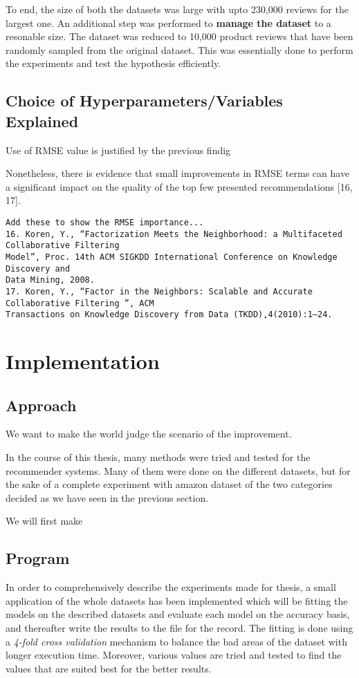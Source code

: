 To end, the size of both the datasets was large with upto 230,000 reviews for the largest one. An additional step was performed to \textbf{manage the dataset} to a resonable size. The dataset was reduced to 10,000 product reviews that have been randomly sampled from the original dataset. This was essentially done to perform the experiments and test the hypothesis efficiently.


\subsection{Choice of Hyperparameters/Variables Explained}

Use of RMSE value is justified by the previous findig


Nonetheless, there is evidence that small improvements in RMSE terms can have a significant impact on the quality of the top few presented recommendations [16, 17].

\begin{verbatim}
Add these to show the RMSE importance...
16. Koren, Y., “Factorization Meets the Neighborhood: a Multifaceted Collaborative Filtering
Model”, Proc. 14th ACM SIGKDD International Conference on Knowledge Discovery and
Data Mining, 2008.
17. Koren, Y., “Factor in the Neighbors: Scalable and Accurate Collaborative Filtering ”, ACM
Transactions on Knowledge Discovery from Data (TKDD),4(2010):1–24.
\end{verbatim}





\section{Implementation}
\subsection{Approach}
We want to make the world judge the scenario of the improvement.

In the course of this thesis, many methods were tried and tested for the recommender systems. Many of them were done on the different datasets, but for the sake of a complete experiment with amazon dataset of the two categories decided as we have seen in the previous section. 

We will first make 


\subsection{Program}
In order to comprehensively describe the experiments made for thesis, a small application of the whole datasets has been implemented which will be fitting the models on the described datasets and evaluate each model on the accuracy basis, and thereafter write the results to the file for the record. The fitting is done using a \textit{4-fold cross validation} mechanism to balance the bad areas of the dataset with longer execution time. Moreover, various values are tried and tested to find the values that are suited best for the better results.

